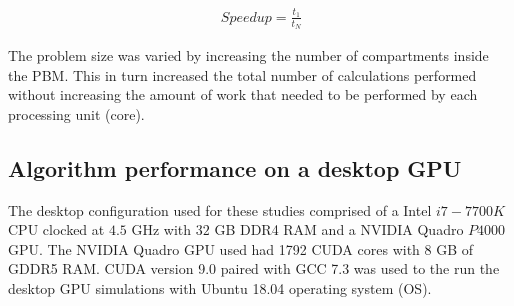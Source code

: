 \documentclass[preprint,10pt,authoryear,review]{elsarticle}
\begin{document}
\begin{linenumbers}
\begin{align}
\ Speedup = \frac{t_1}{t_N}
\label{eqn:result_parallelefficiencyWeak}
\end{align}

The problem size was varied by increasing the number of compartments inside 
the PBM. This in turn increased the total number of calculations performed 
without increasing the amount of work that needed to be performed by each 
processing unit (core).


\subsection{Algorithm performance on a desktop GPU}
The desktop configuration used for these studies comprised of a Intel $i7-7700K$  
CPU clocked at $4.5$ GHz with $32$ GB DDR4 RAM and a NVIDIA Quadro $P4000$ GPU. 
The NVIDIA Quadro GPU used had 1792 CUDA cores with 8 GB of GDDR5 RAM. 
CUDA version 9.0 paired with GCC 7.3 was used to the run the desktop GPU simulations 
with Ubuntu 18.04 operating system (OS).



\end{linenumbers}
\end{document}
